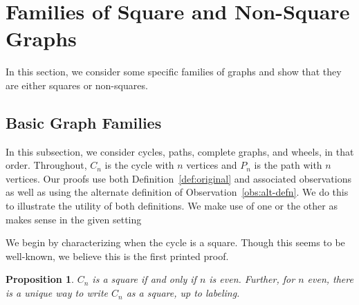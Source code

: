 \documentclass{article}
\newtheorem{proposition}[theorem]{Proposition}
\theoremstyle{definition}
\begin{document}
\section{Families of Square and Non-Square Graphs} \label{sec:families}

In this section, we consider some specific families of graphs and show that they are either squares or non-squares.

\subsection{Basic Graph Families}
In this subsection, we consider cycles, paths, complete graphs, and wheels, in that order. Throughout, $C_n$ is the cycle with $n$ vertices and $P_n$ is the path with $n$ vertices.  Our proofs use both Definition~\ref{def:original} and associated observations as well as using the alternate definition of Observation~\ref{obs:alt-defn}. We do this to illustrate the utility of both definitions.  We make use of one or the other as makes sense in the given setting

We begin by characterizing when the cycle is a square. Though this seems to be well-known, we believe this is the first printed proof.

\begin{proposition} \label{pr:cycles}
    $C_n$ is a square if and only if $n$ is even. Further, for $n$ even, there is a unique way to write $C_n$ as a square, up to labeling.
\end{proposition}
\end{document}
